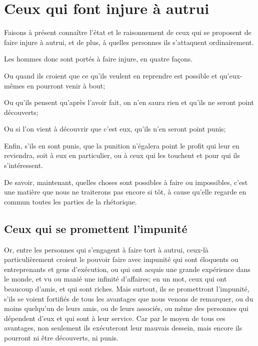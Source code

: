 
\section{Ceux qui font injure à autrui}

Faisons à présent connaître l'état et le raisonnement de ceux qui se proposent de faire injure à autrui, et de plus,
à quelles personnes ils s'attaquent ordinairement.

\bigbreak

Les hommes donc sont portés à faire injure, en quatre façons. 

\begin{emphpar}
	Ou quand ils croient que ce qu'ils veulent en reprendre est possible et qu'eux-mêmes en pourront venir à
	bout;

	Ou qu'ils pensent qu'après l'avoir fait, on n'en saura rien et qu'ils ne seront point découverts;

	Ou si l'on vient à découvrir que c'est eux, qu'ils n'en seront point punis;

	Enfin, s'ils en sont punis, que la punition n'égalera point le profit qui leur en reviendra, soit à eux en
	particulier, ou à ceux qui les touchent et pour qui ils s'intéressent.
\end{emphpar}

De savoir, maintenant, quelles choses sont possibles à faire ou impossibles, c'est une matière que nous ne
traiterons pas encore si tôt, à cause qu'elle regarde en commun toutes les parties de la rhétorique. 

\subsection{Ceux qui se promettent l'impunité}

Or, entre les personnes qui s'engagent à faire tort à autrui, ceux-là particulièrement croient le pouvoir faire
avec impunité qui sont éloquents ou entreprenants et gens d'exécution, ou qui ont acquis une grande expérience
dans le monde, et vu ou manié une infinité d'affaires; en un mot, ceux qui ont beaucoup d'amis, et qui sont
riches. Mais surtout, ils se promettront l'impunité, s'ils se voient fortifiés de tous les avantages que nous
venons de remarquer, ou du moins quelqu'un de leurs amis, ou de leurs associés, ou même des personnes qui dépendent
d'eux et qui sont à leur service. Car par le moyen de tous ces avantages, non seulement ils exécuteront leur mauvais
dessein, mais encore ils pourront ni être découverts, ni punis. 

